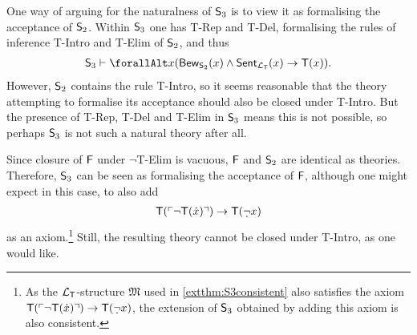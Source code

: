 \documentclass[UKenglish,cleveref,DIV=12]{scrartcl}
\let\forall\forallAlt
\theoremstyle{definition}
\theoremstyle{definition}
\begin{document}
One way of arguing for the naturalness of $\mathsf{S}_3$ is to view it as formalising the acceptance of $\mathsf{S}_2$. Within $\mathsf{S}_3$ one has T-Rep and T-Del, formalising the rules of inference T-Intro and T-Elim of $\mathsf{S}_2$, and thus
\begin{align*}
  \theory S_3\proves
  \forall x( \Prov_{\theory S_2}(x)\land\Sent_{\L_\T}(x)\rightarrow \T(x)).
\end{align*}
However, $\mathsf{S}_2$ contains the rule T-Intro, so it seems reasonable that the theory attempting to formalise its acceptance should also be closed under T-Intro. But the presence of T-Rep, T-Del and T-Elim in $\mathsf{S}_3$ means this is not possible, so perhaps $\mathsf{S}_3$ is not such a natural theory after all.

Since closure of $\mathsf{F}$ under $\lnot$T-Elim is vacuous, $\mathsf{F}$ and $\mathsf{S}_2$ are identical as theories. Therefore, $\mathsf{S}_3$ can be seen as formalising the acceptance of $\mathsf{F}$, although one might expect in this case, to also add
\begin{align*}%
  \T(\gn{\lnot \T(\dot x)})\rightarrow \T(\dlnot x)
\end{align*}
as an axiom.\footnote{As the $\mathcal{L}_{\mathsf{T}}$-structure $\mathfrak{M}$ used in \cref{extthm:S3consistent} also satisfies the axiom $\T(\gn{\lnot \T(\dot x)})\rightarrow \T(\dlnot x)$, the extension of $\mathsf{S}_3$ obtained by adding this axiom is also consistent.} Still, the resulting theory cannot be closed under T-Intro, as one would like.
\end{document}
